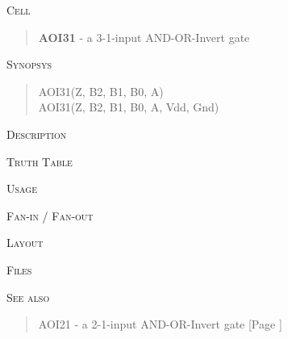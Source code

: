 
\label{AOI31}
\textsc{Cell}
\begin{quote}
    \textbf{AOI31} - a 3-1-input AND-OR-Invert gate
\end{quote}

\textsc{Synopsys}
\begin{quote}
    AOI31(Z, B2, B1, B0, A) \\
    AOI31(Z, B2, B1, B0, A, Vdd, Gnd)
\end{quote}

\textsc{Description}

%

\textsc{Truth Table}


\textsc{Usage}

\textsc{Fan-in / Fan-out}

\textsc{Layout}

\textsc{Files}

\textsc{See also}
\begin{quote}
    AOI21 - a 2-1-input AND-OR-Invert gate [Page \pageref{AOI21}]
\end{quote}
